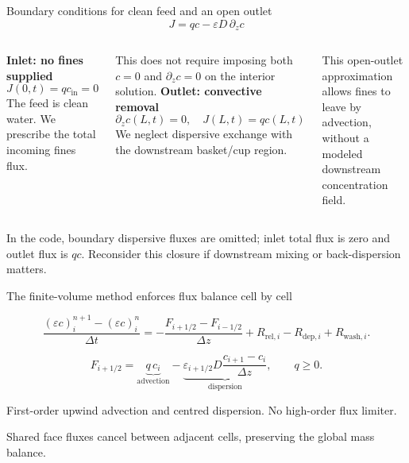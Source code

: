 \documentclass[aspectratio=169,11pt]{beamer}
\newcommand{\hi}[1]{\textcolor{tumblue}{\textbf{#1}}}
\begin{document}
\begin{frame}{Boundary conditions for clean feed and an open outlet}
\small
\[J=qc-\varepsilon D\,\partial_zc\]
\begin{columns}[T,onlytextwidth]
\hi{Inlet: no fines supplied}
\[J(0,t)=q c_{\mathrm{in}}=0\]
The feed is clean water. We prescribe the total incoming fines flux.
\par\medskip
This does not require imposing both $c=0$ and $\partial_zc=0$ on the interior solution.
\hi{Outlet: convective removal}
\[\partial_zc(L,t)=0,\quad J(L,t)=qc(L,t)\]
We neglect dispersive exchange with the downstream basket/cup region.
\par\medskip
This open-outlet approximation allows fines to leave by advection, without a modeled downstream concentration field.
\end{columns}
\vfill
\small In the code, boundary dispersive fluxes are omitted; inlet total flux is zero and outlet flux is $qc$. Reconsider this closure if downstream mixing or back-dispersion matters.
\end{frame}

\begin{frame}{The finite-volume method enforces flux balance cell by cell}
 \centering
 \vspace{.15cm}

\[
\frac{(\varepsilon c)_i^{n+1}-(\varepsilon c)_i^n}{\Delta t}
=
-\frac{F_{i+1/2}-F_{i-1/2}}{\Delta z}
+R_{\mathrm{rel},i}-R_{\mathrm{dep},i}+R_{\mathrm{wash},i}.
\]

\[
F_{i+1/2}
=
\underbrace{q\,c_i}_{\text{advection}}
-
\underbrace{
	\varepsilon_{i+1/2}D
	\frac{c_{i+1}-c_i}{\Delta z}
}_{\text{dispersion}},
\qquad q\geq 0.
\]

\small
First-order upwind advection and centred dispersion. No high-order flux limiter.
\par\medskip Shared face fluxes cancel between adjacent cells, preserving the global mass balance.
\end{frame}
\end{document}

